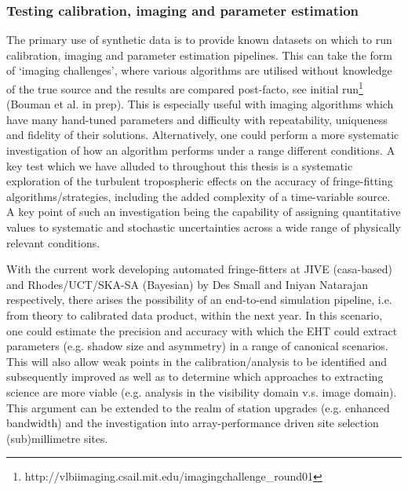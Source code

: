 \subsubsection{Testing calibration, imaging and parameter estimation}

The primary use of synthetic data is to provide known datasets on which to run calibration, imaging and parameter estimation pipelines. This can take the form of `imaging challenges', where various algorithms are utilised without knowledge of the true source and the results are compared post-facto, see initial run\footnote{http://vlbiimaging.csail.mit.edu/imagingchallenge\_round01} (Bouman et al. in prep). This is especially useful with imaging algorithms which have many hand-tuned parameters and difficulty with repeatability, uniqueness and fidelity of their solutions. Alternatively, one could perform a more systematic investigation of how an algorithm performs under a range different conditions. A key test which we have alluded to throughout this thesis is a systematic exploration of the turbulent tropospheric effects on the accuracy of fringe-fitting algorithms/strategies, including the added complexity of a time-variable source. A key point of such an investigation being the capability of assigning quantitative values to systematic and stochastic uncertainties across a wide range of physically relevant conditions.



With the current work developing automated fringe-fitters at JIVE ({\sc casa}-based) and Rhodes/UCT/SKA-SA (Bayesian) by Des Small and Iniyan Natarajan respectively, there arises the possibility of an end-to-end simulation pipeline, i.e. from theory to calibrated data product, within the next year. In this scenario, one could estimate the precision and accuracy with which the EHT could extract parameters (e.g. shadow size and asymmetry) in a range of canonical scenarios. This will also allow weak points in the calibration/analysis to be identified and subsequently improved as well as to determine which approaches to extracting science are more viable (e.g. analysis in the visibility domain v.s. image domain).
This argument can be extended to the realm of station upgrades (e.g. enhanced bandwidth) and the investigation into array-performance driven site selection (sub)millimetre sites. 


